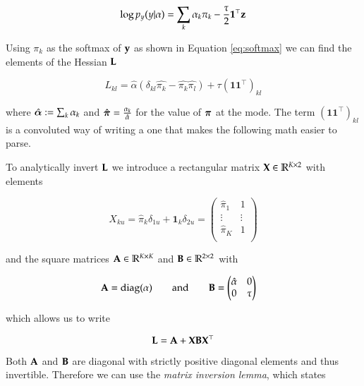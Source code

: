 \begin{equation}
    \log p_y(y|\alpha) = \sum_k \alpha_k \pi_k - \frac{\tau}{2} \mathbf{1}^\top {\mathbf{z}}
\end{equation}

Using $\pi_k$ as the softmax of $\mathbf{y}$ as shown in Equation \ref{eq:softmax} we can find the elements of the Hessian ${\mathbf{L}}$

\begin{equation}
    L_{kl} = \hat{\alpha}(\delta_{kl}\hat{\pi_k} - \hat{\pi_k} \hat{\pi_l}) + \tau(\mathbf{1}\mathbf{1}^\top)_{kl}
\end{equation}

where $\hat{{\boldsymbol{\alpha}}} := \sum_k \alpha_k$ and $\hat{\boldsymbol{\pi}} = \frac{\alpha_k}{\hat{\alpha}}$ for the value
of $\boldsymbol{\pi}$ at the mode. The term $(\mathbf{1}\mathbf{1}^\top)_{kl}$ is a convoluted way of writing a one that makes the following math easier to parse. 

To analytically invert ${\mathbf{L}}$ we introduce a rectangular matrix ${\mathbf{X}} \in \mathbb{R}^{K\times 2}$ with elements

\begin{equation}
	X_{ku} = \hat{\pi}_k\delta_{1u} + \mathbf{1}_k\delta_{2u} = \begin{pmatrix}
		\hat{\pi}_1 & 1 \\
		\vdots & \vdots \\
		\hat{\pi}_K & 1 \\
	\end{pmatrix}
\end{equation}

and the square matrices ${\mathbf{A}} \in \mathbb{R}^{K\times K}$ and ${\mathbf{B}} \in \mathbb{R}^{2 \times 2}$ with 

\begin{align}
	{\mathbf{A}} &= \text{diag}(\alpha)  \qquad\text{and}\qquad {\mathbf{B}} = \begin{pmatrix}
		\hat{\alpha} & 0 \\
		0 & \tau
	\end{pmatrix}
\end{align}

which allows us to write 

\begin{equation}
	{\mathbf{L}} = {\mathbf{A}} + {\mathbf{X}}{\mathbf{B}}{\mathbf{X}}^\top
\end{equation}

Both ${\mathbf{A}}$ and ${\mathbf{B}}$ are diagonal with strictly positive diagonal elements and thus invertible. Therefore we can use the \textit{matrix inversion lemma}, which states

